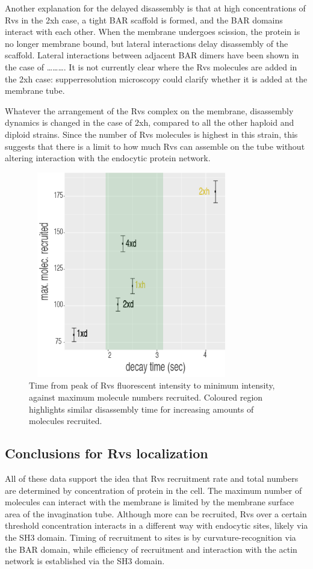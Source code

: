 	\vspace{5mm}
Another explanation for the delayed disassembly is that at high concentrations of Rvs in the 2xh case, a tight BAR scaffold is formed, and the BAR domains interact with each other. When the membrane undergoes scission, the protein is no longer membrane bound, but lateral interactions delay disassembly of the scaffold. Lateral interactions between adjacent BAR dimers have been shown in the case of ………. It is not currently clear where the Rvs molecules are added in the 2xh case: supperresolution microscopy could clarify whether it is added at the membrane tube.

\vspace{5mm}
Whatever the arrangement of the Rvs complex on the membrane, disassembly dynamics is changed in the case of 2xh, compared to all the other haploid and diploid strains. Since the number of Rvs molecules is highest in this strain, this suggests that there is a limit to how much Rvs can assemble on the tube without altering interaction with the endocytic protein network. 

\begin{figure}[H]
	\centering
	\includegraphics[width=9cm,height=9cm,keepaspectratio]{figures/discussion/decay_final}
	\caption[Rvs decay time]
	{Time from peak of Rvs fluorescent intensity to minimum intensity, against maximum molecule numbers recruited. Coloured region highlights similar disassembly time for increasing amounts of molecules recruited.    
		\label{disc_decay}}
\end{figure}

\subsection{Conclusions for Rvs localization }
All of these data support the idea that Rvs recruitment rate and total numbers are determined by concentration of protein in the cell. The maximum number of molecules can interact with the membrane is limited by the membrane surface area of the invagination tube. Although more can be recruited, Rvs over a certain threshold concentration interacts in a different way with endocytic sites, likely via the SH3 domain. Timing of recruitment to sites is by curvature-recognition via the BAR domain, while efficiency of recruitment and interaction with the actin network is established via the SH3 domain. 



